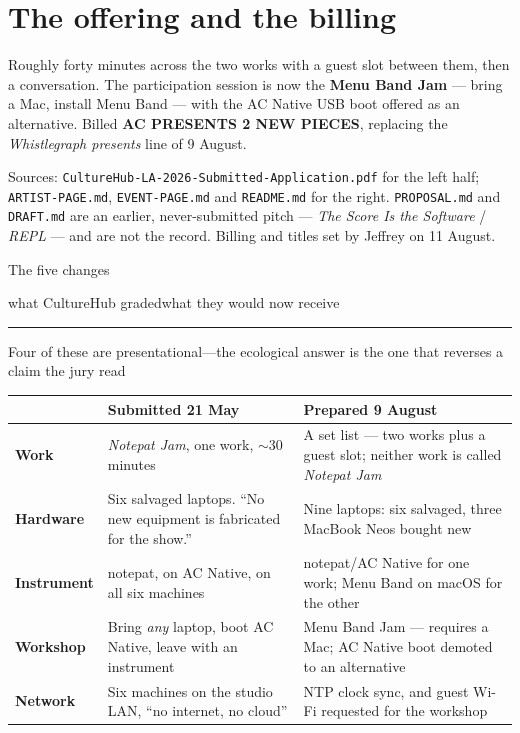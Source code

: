 \documentclass[10pt,letterpaper]{article}
\newcommand{\dsep}{{\normalfont\;\textperiodcentered\;}}
\newcommand{\ddash}{{\normalfont\;---\;}}
\renewcommand{\packettitle}[2]{%
  {\acbold\fontsize{22pt}{24pt}\selectfont\color{acdark}#1\par}%
  \vspace{0.10em}%
  {\hyphenpenalty=10000\exhyphenpenalty=10000\RaggedRight
   \aclight\fontsize{11.5pt}{13.5pt}\selectfont\color{acpink}#2\par}%
  \vspace{0.22em}\color{acpink}\rule{\linewidth}{1pt}\color{black}\vspace{0.14em}%
}
\renewcommand{\pageclaim}[1]{%
  {\hyphenpenalty=10000\exhyphenpenalty=10000\RaggedRight
   \aclight\fontsize{12.5pt}{15pt}\selectfont\color{acpink}#1\par}\vspace{0.18em}}
\renewcommand{\credit}[1]{{\fontsize{7.8pt}{9.4pt}\selectfont\color{acgray}#1\par}}
\begin{document}
\section{The offering and the billing}
Roughly forty minutes across the two works with a guest slot between them, then a
conversation. The participation session is now the \textbf{Menu Band Jam} — bring
a Mac, install Menu Band — with the AC Native USB boot offered as an alternative.
Billed \textbf{AC PRESENTS 2 NEW PIECES}, replacing the
\emph{Whistlegraph presents} line of 9 August.

\credit{Sources: \texttt{CultureHub-LA-2026-Submitted-Application.pdf} for the
left half; \texttt{ARTIST-PAGE.md}, \texttt{EVENT-PAGE.md} and \texttt{README.md}
for the right. \texttt{PROPOSAL.md} and \texttt{DRAFT.md} are an earlier,
never-submitted pitch — \emph{The Score Is the Software} / \emph{REPL} — and are
not the record. Billing and titles set by Jeffrey on 11 August.}

\clearpage
\packettitle{The five changes}{what CultureHub graded\dsep what they would now receive}

\pageclaim{Four of these are presentational\ddash the ecological answer is
the one that reverses a claim the jury read}

{\tighttable
\begin{tabularx}{\linewidth}{L{0.92in} Y Y}
\toprule
& \textbf{Submitted 21 May} & \textbf{Prepared 9 August} \\
\midrule
\textbf{Work} &
\emph{Notepat Jam}, one work, ${\sim}$30 minutes &
A set list — two works plus a guest slot; neither work is called \emph{Notepat Jam} \\
\textbf{Hardware} &
Six salvaged laptops. ``No new equipment is fabricated for the show.'' &
Nine laptops: six salvaged, three MacBook Neos bought new \\
\textbf{Instrument} &
notepat, on AC Native, on all six machines &
notepat/AC Native for one work; Menu Band on macOS for the other \\
\textbf{Workshop} &
Bring \emph{any} laptop, boot AC Native, leave with an instrument &
Menu Band Jam — requires a Mac; AC Native boot demoted to an alternative \\
\textbf{Network} &
Six machines on the studio LAN, ``no internet, no cloud'' &
NTP clock sync, and guest Wi-Fi requested for the workshop \\
\bottomrule
\end{tabularx}}
\end{document}
